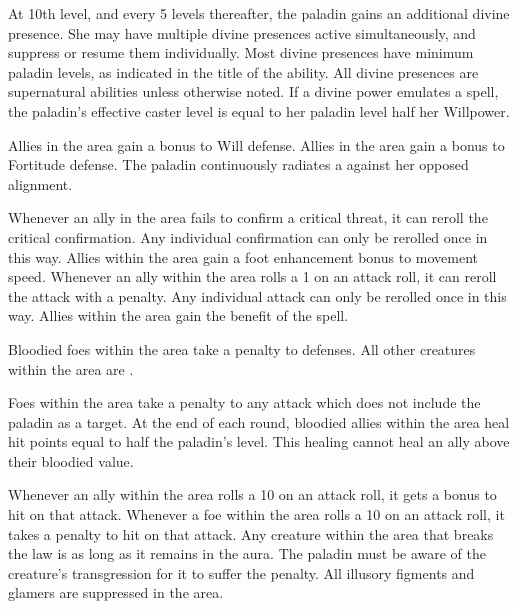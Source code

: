 At 10th level, and every 5 levels thereafter, the paladin gains an additional divine presence.
She may have multiple divine presences active simultaneously, and suppress or resume them individually.
Most divine presences have minimum paladin levels, as indicated in the title of the ability.
All divine presences are supernatural abilities unless otherwise noted.
If a divine power emulates a spell, the paladin's effective caster level is equal to her paladin level \add half her Willpower.

Allies in the area gain a  bonus to Will defense.
Allies in the area gain a  bonus to Fortitude defense.
 The paladin continuously radiates a 
against her opposed alignment.

Whenever an ally in the area fails to confirm a critical threat, it can reroll the critical confirmation.
Any individual confirmation can only be rerolled once in this way.
Allies within the area gain a  foot enhancement bonus to movement speed.
Whenever an ally within the area rolls a 1 on an attack roll, it can reroll the attack with a  penalty.
Any individual attack can only be rerolled once in this way.
 Allies within the area gain the benefit of the 
spell.

Bloodied foes within the area take a  penalty to defenses.
All other creatures within the area are \vulnerable.

Foes within the area take a  penalty to any attack which does not include the paladin as a target.
At the end of each round, bloodied allies within the area heal hit points equal to half the paladin's level.
This healing cannot heal an ally above their bloodied value.

Whenever an ally within the area rolls a 10 on an attack roll, it gets a  bonus to hit on that attack.
Whenever a foe within the area rolls a 10 on an attack roll, it takes a  penalty to hit on that attack.
Any creature within the area that breaks the law is \vulnerable as long as it remains in the aura.
The paladin must be aware of the creature's transgression for it to suffer the penalty.
All illusory figments and glamers are suppressed in the area.

